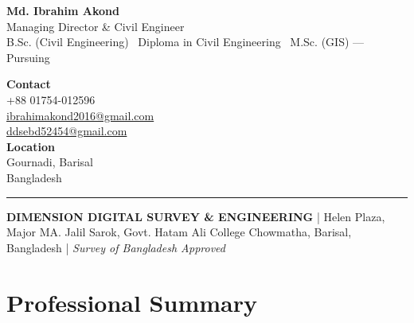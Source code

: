 \documentclass[11pt, a4paper]{article}
\begin{document}
\noindent
\begin{minipage}[t]{0.68\linewidth}
  \vspace{0pt}
  {\fontsize{28}{32}\selectfont\bfseries\color{ddseNavy} Md. Ibrahim Akond}\\[4pt]
  {\large\color{ddseBlue} Managing Director \& Civil Engineer}\\[6pt]
  {\color{ddseMid}\small
    B.Sc. (Civil Engineering) \textbullet\
    Diploma in Civil Engineering \textbullet\
    M.Sc. (GIS) — Pursuing
  }
\end{minipage}%
\hfill
\begin{minipage}[t]{0.30\linewidth}
  \vspace{0pt}
  \raggedleft
  {\color{ddseMid}\small
    \textbf{\color{ddseNavy}Contact}\\[3pt]
    +88 01754-012596\\[2pt]
    \href{mailto:ibrahimakond2016@gmail.com}{ibrahimakond2016@gmail.com}\\[2pt]
    \href{mailto:ddsebd52454@gmail.com}{ddsebd52454@gmail.com}\\[4pt]
    \textbf{\color{ddseNavy}Location}\\[3pt]
    Gournadi, Barisal\\
    Bangladesh
  }
\end{minipage}

\vspace{6pt}
{\color{ddseAmber}\rule{\linewidth}{2.5pt}}
\vspace{2pt}

\noindent
\colorbox{ddseNavy!8}{%
  \begin{minipage}{\dimexpr\linewidth-2\fboxsep}
    \vspace{5pt}
    \centering
    {\small\color{ddseNavy}
      \textbf{DIMENSION DIGITAL SURVEY \& ENGINEERING} \quad|\quad
      Helen Plaza, Major MA. Jalil Sarok, Govt. Hatam Ali College Chowmatha, Barisal, Bangladesh \quad|\quad
      \textit{Survey of Bangladesh Approved}
    }
    \vspace{5pt}
  \end{minipage}%
}

\vspace{10pt}

\section{Professional Summary}
\end{document}
